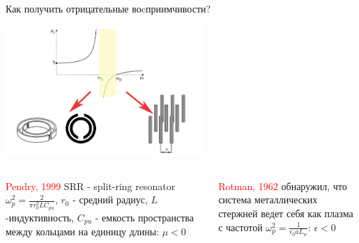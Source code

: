 \documentclass[9pt, compress, xcolor=table]{beamer}
\begin{document}

\begin{frame}{Как получить отрицательные воcприимчивости?}
\begin{center}
\includegraphics[width=7.5cm]{neg_ref_7d}
\end{center}

\begin{columns}[c]
\column{5.5cm} \begin{block}{\textcolor{red}{Pendry, 1999}} SRR - split-ring resonator
$\omega_p^2 = \frac{2}{\pi r_0^2 L C_{pu}}$, $r_0$ - средний радиус, $L$ -индуктивность, $C_{pu}$ -
емкость пространства между кольцами на единицу длины: $\mu < 0$\end{block}

\column{5.5cm}\begin{block}{\textcolor{red}{Rotman, 1962}} обнаружил, что система
металлических стержней ведет себя как плазма с частотой $\omega_p^2 = \frac{1}{\epsilon_0 a L_w}$:
$\epsilon < 0$\end{block}
\end{columns}
\end{frame}
\end{document}
